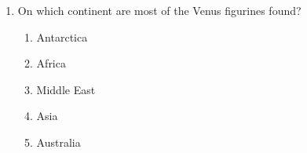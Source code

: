 \documentclass[12pt]{article}
\begin{document}
\begin{enumerate}[label=\arabic*.]
\begin{enumerate}[label=(\alph*)]
    \item tactical collecting.
    \item symbolic foraging.
    \item systematic hunting.
    \item resource planning.
    \item logistical collecting.
\end{enumerate}
\item On which continent are most of the Venus figurines found?
\begin{enumerate}[label=(\alph*)]
    \item Antarctica
    \item Africa
    \item Middle East
    \item Asia
    \item Australia
\end{enumerate}
\end{enumerate}
\end{document}
